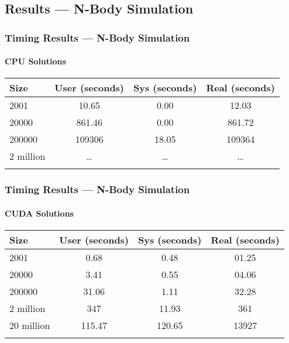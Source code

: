 \documentclass{beamer}
\begin{document}
\subsection{Results --- N-Body Simulation}
\begin{frame}
\frametitle{Timing Results --- N-Body Simulation}
\framesubtitle{CPU Solutions}
\begin{table}[htb]
\centering{}
\begin{tabular}{lccc}
\toprule{}
\textbf{Size} & \textbf{User (seconds)} &
\textbf{Sys (seconds)} & \textbf{Real (seconds)} \\
\midrule{}
2001          & 10.65   & 0.00    & 12.03 \\
\midrule{}
20000         & 861.46  & 0.00    & 861.72 \\
\midrule{}
200000        & 109306  & 18.05   & 109364 \\
\midrule{}
2 million     & \dots{} & \dots{} & \dots{} \\
\bottomrule{}
\end{tabular}
\end{table}
\end{frame}
\begin{frame}
\frametitle{Timing Results --- N-Body Simulation}
\framesubtitle{CUDA Solutions}
\begin{table}[htb]
\begin{tabular}{lccc}
\toprule{}
\textbf{Size} & \textbf{User (seconds)} &
\textbf{Sys (seconds)} & \textbf{Real (seconds)} \\
\midrule{}
2001          & 0.68    & 0.48    & 01.25 \\
\midrule{}
20000         & 3.41    & 0.55    & 04.06 \\
\midrule{}
200000        & 31.06   & 1.11    & 32.28 \\
\midrule{}
2 million     & 347     & 11.93   & 361   \\
\midrule{}
20 million    & 115.47  & 120.65  & 13927 \\
\bottomrule{}
\end{tabular}
\end{table}
\end{frame}
\end{document}
